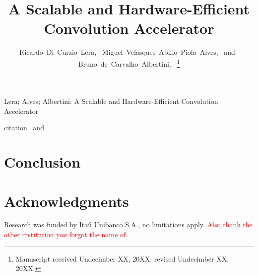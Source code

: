 \documentclass[10pt,journal,compsoc]{IEEEtran}
\newcommand*{\todo}[1]{\textcolor{red}{#1}}
\begin{document}
\title{A Scalable and Hardware-Efficient\\Convolution Accelerator}

\author{
  Ricardo~Di~Curzio~Lera,~
  Miguel~Velasques~Abilio~Piola~Alves,~\IEEEmembership{\todo{Miguel membership},~IEEE,} and~%
  Bruno~de~Carvalho~Albertini,~\IEEEmembership{\todo{Albertini membership},~IEEE}%
  \thanks{Manuscript received Undecimber XX, 20XX; revised Undecimber XX, 20XX.}
}

%
{Lera; Alves; Albertini: A Scalable and Hardware-Efficient Convolution Accelerator}



\maketitle
\IEEEpeerreviewmaketitle

   citation~\cite{smith1997scientist} and \lipsum[1-2]

\section{Conclusion}
  \lipsum[1]

\section*{Acknowledgments}%
Research was funded by Itaú Unibanco S.A., no limitations apply. \todo{Also thank the other institution you forgot the name of.}
\end{document}
